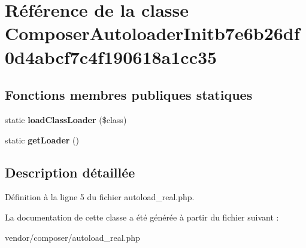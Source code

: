 \hypertarget{class_composer_autoloader_initb7e6b26df0d4abcf7c4f190618a1cc35}{}\section{Référence de la classe Composer\+Autoloader\+Initb7e6b26df0d4abcf7c4f190618a1cc35}
\label{class_composer_autoloader_initb7e6b26df0d4abcf7c4f190618a1cc35}
\subsection*{Fonctions membres publiques statiques}
\begin{DoxyCompactItemize}
\item 
static {\bfseries load\+Class\+Loader} (\$class)\hypertarget{class_composer_autoloader_initb7e6b26df0d4abcf7c4f190618a1cc35_a3ab1fc00c945e73b85a36acbb5d21530}{}\label{class_composer_autoloader_initb7e6b26df0d4abcf7c4f190618a1cc35_a3ab1fc00c945e73b85a36acbb5d21530}

\item 
static {\bfseries get\+Loader} ()\hypertarget{class_composer_autoloader_initb7e6b26df0d4abcf7c4f190618a1cc35_a4f29c9e935451ce6ea4e4b9821ba6280}{}\label{class_composer_autoloader_initb7e6b26df0d4abcf7c4f190618a1cc35_a4f29c9e935451ce6ea4e4b9821ba6280}

\end{DoxyCompactItemize}


\subsection{Description détaillée}


Définition à la ligne 5 du fichier autoload\+\_\+real.\+php.



La documentation de cette classe a été générée à partir du fichier suivant \+:\begin{DoxyCompactItemize}
\item 
vendor/composer/autoload\+\_\+real.\+php\end{DoxyCompactItemize}
